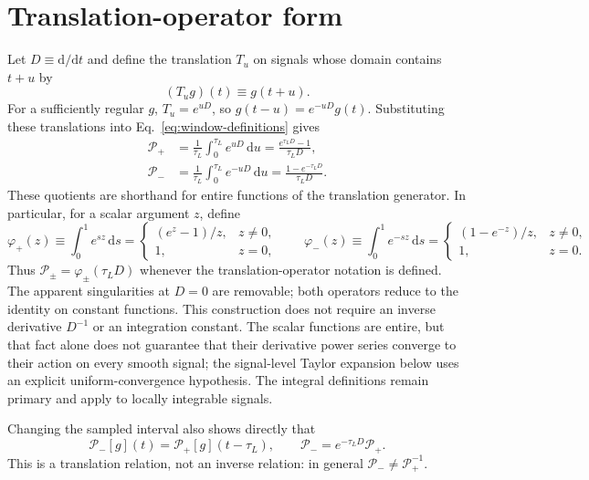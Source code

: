 \documentclass[12pt]{article}
\begin{document}
\section{Translation-operator form}

Let $D\equiv\mathrm{d}/\mathrm{d}t$ and define the translation $T_u$ on signals whose domain contains $t+u$ by
\begin{equation}
  (T_ug)(t)\equiv g(t+u).
\end{equation}
For a sufficiently regular $g$, $T_u=e^{uD}$, so $g(t-u)=e^{-uD}g(t)$. Substituting these translations into Eq.~\eqref{eq:window-definitions} gives
\begin{align}
  \mathcal{P}_{+}
  &=\frac{1}{\tau_L}\int_0^{\tau_L}e^{uD}\,\mathrm{d}u
   =\frac{e^{\tau_LD}-1}{\tau_LD},
  \label{eq:operator-plus}\\
  \mathcal{P}_{-}
  &=\frac{1}{\tau_L}\int_0^{\tau_L}e^{-uD}\,\mathrm{d}u
   =\frac{1-e^{-\tau_LD}}{\tau_LD}.
  \label{eq:operator-minus}
\end{align}
These quotients are shorthand for entire functions of the translation generator. In particular, for a scalar argument $z$, define
\begin{equation}
  \varphi_{+}(z)\equiv\int_0^1e^{sz}\,\mathrm{d}s
  =\begin{cases}(e^z-1)/z,&z\ne0,\\1,&z=0,\end{cases}
  \qquad
  \varphi_{-}(z)\equiv\int_0^1e^{-sz}\,\mathrm{d}s
  =\begin{cases}(1-e^{-z})/z,&z\ne0,\\1,&z=0.\end{cases}
  \label{eq:entire-window-functions}
\end{equation}
Thus $\mathcal{P}_{\pm}=\varphi_{\pm}(\tau_LD)$ whenever the translation-operator notation is defined. The apparent singularities at $D=0$ are removable; both operators reduce to the identity on constant functions. This construction does not require an inverse derivative $D^{-1}$ or an integration constant. The scalar functions are entire, but that fact alone does not guarantee that their derivative power series converge to their action on every smooth signal; the signal-level Taylor expansion below uses an explicit uniform-convergence hypothesis. The integral definitions remain primary and apply to locally integrable signals.

Changing the sampled interval also shows directly that
\begin{equation}
  \mathcal{P}_{-}[g](t)=\mathcal{P}_{+}[g](t-\tau_L),
  \qquad
  \mathcal{P}_{-}=e^{-\tau_LD}\mathcal{P}_{+}.
  \label{eq:translation-relation}
\end{equation}
This is a translation relation, not an inverse relation: in general $\mathcal{P}_{-}\ne\mathcal{P}_{+}^{-1}$.
\end{document}
